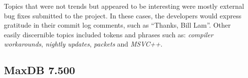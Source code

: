 \documentclass[times, 10pt,twocolumn]{article}
\newcommand{\shrinkit}{\vspace*{-.3em}}
\begin{document}
Topics that were not trends but appeared to be interesting were mostly
external bug fixes submitted to the project.  In these cases, the
developers would express gratitude in their commit log comments, such
as ``Thanks, Bill Lam''.  Other easily discernible topics included
tokens and phrases such as: \emph{compiler workarounds}, \emph{nightly
  updates}, \emph{packets} and \emph{MSVC++}.







\shrinkit
\subsection{MaxDB 7.500}
\shrinkit



\end{document}
